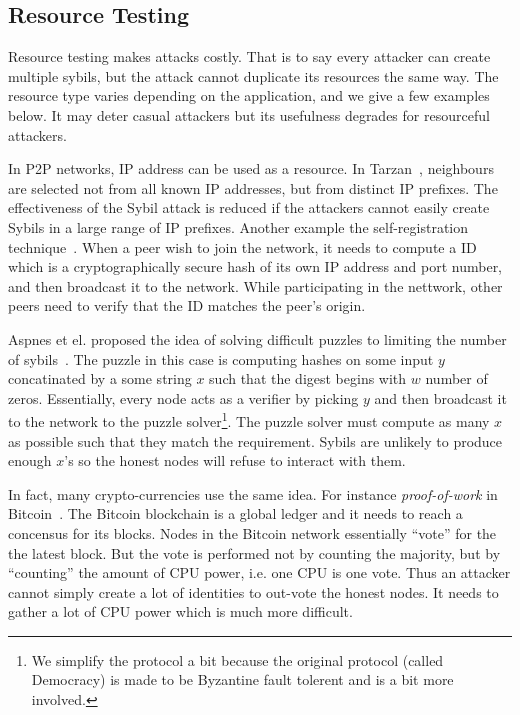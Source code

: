 
\subsection{Resource Testing}\label{sec:resource-testing}
Resource testing makes attacks costly. That is to say every attacker can create
multiple sybils, but the attack cannot duplicate its resources the same way. The
resource type varies depending on the application, and we give a few examples
below. It may deter casual attackers but its usefulness degrades for resourceful
attackers.


In P2P networks, IP address can be used as a resource. In
Tarzan~\cite{freedman2002tarzan}, neighbours are selected not from all known IP
addresses, but from distinct IP prefixes. The effectiveness of the Sybil attack
is reduced if the attackers cannot easily create Sybils in a large range of IP
prefixes. Another example the self-registration
technique~\cite{dinger2006defending}. When a peer wish to join the network, it
needs to compute a ID which is a cryptographically secure hash of its own IP
address and port number, and then broadcast it to the network. While
participating in the nettwork, other peers need to verify that the ID matches
the peer's origin.

Aspnes et el. proposed the idea of solving difficult puzzles to limiting the
number of sybils~\cite{aspnes2005exposing}. The puzzle in this case is computing
hashes on some input $y$ concatinated by a some string $x$ such that the digest
begins with $w$ number of zeros. Essentially, every node acts as a verifier by
picking $y$ and then broadcast it to the network to the puzzle
solver\footnote{We simplify the protocol a bit because the original protocol
  (called Democracy) is made to be Byzantine fault tolerent and is a bit more
  involved.}. The puzzle solver must compute as many $x$ as possible such that
they match the requirement. Sybils are unlikely to produce enough $x$'s so the
honest nodes will refuse to interact with them.

In fact, many crypto-currencies use the same idea. For instance
\emph{proof-of-work} in Bitcoin~\cite{nakamoto2008bitcoin}. The Bitcoin
blockchain is a global ledger and it needs to reach a concensus for its blocks.
Nodes in the Bitcoin network essentially ``vote'' for the the latest block. But
the vote is performed not by counting the majority, but by ``counting'' the
amount of CPU power, i.e. one CPU is one vote. Thus an attacker cannot simply
create a lot of identities to out-vote the honest nodes. It needs to gather a
lot of CPU power which is much more difficult.

